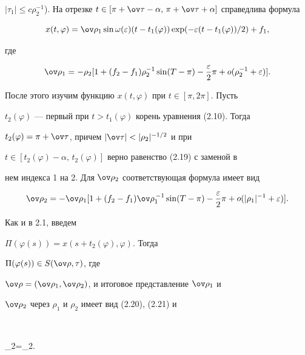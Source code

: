 $|\tau_1|\le c\rho_2^{-1}$). На отрезке $t\in[\pi+\ov\tau-\alpha,\,\pi+


\ov\tau+\alpha]$ справедлива формула


\begin{equation}


x(t,\varphi)=\ov\rho_1\sin\omega(\varepsilon)(t-t_1(\varphi))\exp(-


\varepsilon(t-t_1(\varphi))/2) + f_1,


\end{equation}


где


\begin{equation}


\ov\rho_1=-\rho_2[1+(f_2-f_1)\rho_2^{-1}\sin(T-\pi) -


\frac{\varepsilon}{2}\pi + o(\rho_2^{-1}+\varepsilon)].


\end{equation}


После этого изучим функцию $x(t,\varphi)$ при $t\in[\pi,2\pi]$. Пусть


$t_2(\varphi)$ --- первый при $t>t_1(\varphi)$ корень уравнения (2.10). Тогда


$t_2(\varphi)=\pi+\ov\tau$, причем $|\ov\tau|<|\rho_2|^{-1/2}$ и при


$t\in[t_2(\varphi)-\alpha,\,t_2(\varphi)]$ верно равенство (2.19) с заменой в


нем индекса 1 на 2. Для $\ov\rho_2$ соответствующая формула имеет вид


\begin{equation}


\ov\rho_2=-\ov\rho_1[1+(f_2-f_1)\ov\rho_1^{\,-1}\sin(T-\pi) -


\frac{\varepsilon}{2}\pi + o(|\rho_1|^{-1} + \varepsilon)].


\end{equation}


Как и в 2.1, введем


$\Pi(\varphi(s))=x(s+t_2(\varphi),\varphi)$. Тогда 


$\Pi(\varphi(s))\in S(\ov\rho,\tau)$, где


$\ov\rho=(\ov\rho_1,\ov\rho_2)$, и итоговое представление $\ov\rho_1$ и


$\ov\rho_2$ через $\rho_1$ и $\rho_2$ имеет вид (2.20), (2.21) и


$$


\ov\rho_2=\rho_2.


